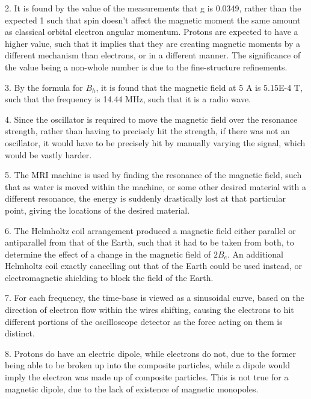 \documentclass[11pt]{article}
\begin{document}
2. It is found by the value of the measurements that g is 0.0349, rather than the expected 1 such that spin doesn’t affect the magnetic moment the same amount as classical orbital electron angular momentum. Protons are expected to have a higher value, such that it implies that they are creating magnetic moments by a different mechanism than electrons, or in a different manner. The significance of the value being a non-whole number is due to the fine-structure refinements.

3. By the formula for $B_h$, it is found that the magnetic field at 5 A is 5.15E-4 T, such that the frequency is 14.44 MHz, such that it is a radio wave.

4. Since the oscillator is required to move the magnetic field over the resonance strength, rather than having to precisely hit the strength, if there was not an oscillator, it would have to be precisely hit by manually varying the signal, which would be vastly harder.

5. The MRI machine is used by finding the resonance of the magnetic field, such that as water is moved within the machine, or some other desired material with a different resonance, the energy is suddenly drastically lost at that particular point, giving the locations of the desired material.

6. The Helmholtz coil arrangement produced a magnetic field either parallel or antiparallel from that of the Earth, such that it had to be taken from both, to determine the effect of a change in the magnetic field of $2B_e$. An additional Helmholtz coil exactly cancelling out that of the Earth could be used instead, or electromagnetic shielding to block the field of the Earth.

7. For each frequency, the time-base is viewed as a sinusoidal curve, based on the direction of electron flow within the wires shifting, causing the electrons to hit different portions of the oscilloscope detector as the force acting on them is distinct.

8. Protons do have an electric dipole, while electrons do not, due to the former being able to be broken up into the composite particles, while a dipole would imply the electron was made up of composite particles. This is not true for a magnetic dipole, due to the lack of existence of magnetic monopoles.

\end{document}
